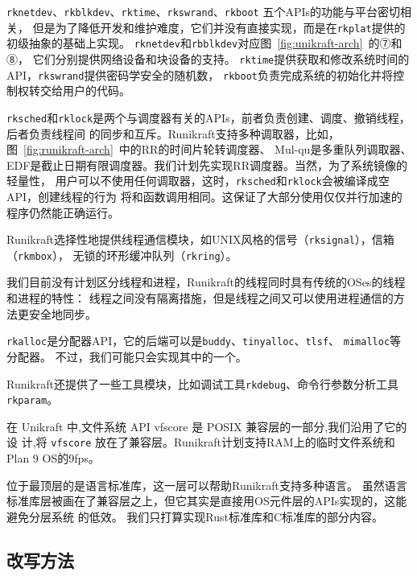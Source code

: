 \documentclass{../runikraft-report}
\begin{document}
\texttt{rknetdev}、\texttt{rkblkdev}、\texttt{rktime}、\texttt{rkswrand}、\texttt{rkboot}
五个APIs的功能与平台密切相关，
但是为了降低开发和维护难度，它们并没有直接实现，而是在\texttt{rkplat}提供的初级抽象的基础上实现。
\texttt{rknetdev}和\texttt{rbblkdev}对应图\ \ref{fig:unikraft-arch}\ 的⑦和⑧，
它们分别提供网络设备和块设备的支持。
\texttt{rktime}提供获取和修改系统时间的API，\texttt{rkswrand}提供密码学安全的随机数，
\texttt{rkboot}负责完成系统的初始化并将控制权转交给用户的代码。

\texttt{rksched}和\texttt{rklock}是两个与调度器有关的APIs，前者负责创建、调度、撤销线程，后者负责线程间
的同步和互斥。Runikraft支持多种调取器，比如，图\ \ref{fig:runikraft-arch}\ 中的RR的时间片轮转调度器、
Mul-qu是多重队列调取器、EDF是截止日期有限调度器。我们计划先实现RR调度器。当然，为了系统镜像的轻量性，
用户可以不使用任何调取器，这时，\texttt{rksched}和\texttt{rklock}会被编译成空API，创建线程的行为
将和函数调用相同。这保证了大部分使用仅仅并行加速的程序仍然能正确运行。

Runikraft选择性地提供线程通信模块，如UNIX风格的信号（\texttt{rksignal}），信箱（\texttt{rkmbox}），
无锁的环形缓冲队列（\texttt{rkring}）。

我们目前没有计划区分线程和进程，Runikraft的线程同时具有传统的OSes的线程和进程的特性：
线程之间没有隔离措施，但是线程之间又可以使用进程通信的方法更安全地同步。

\texttt{rkalloc}是分配器API，它的后端可以是\texttt{buddy}、\texttt{tinyalloc}、\texttt{tlsf}、
\texttt{mimalloc}等分配器。
不过，我们可能只会实现其中的一个。

Runikraft还提供了一些工具模块，比如调试工具\texttt{rkdebug}、命令行参数分析工具\texttt{rkparam}。

在 Unikraft 中,文件系统 API vfscore 是 POSIX 兼容层的一部分,我们沿用了它的设
计,将 \texttt{vfscore} 放在了兼容层。Runikraft计划支持RAM上的临时文件系统和Plan 9 OS的9fps。

位于最顶层的是语言标准库，这一层可以帮助Runikraft支持多种语言。
虽然语言标准库层被画在了兼容层之上，但它其实是直接用OS元件层的APIs实现的，这能避免分层系统
的低效。
我们只打算实现Rust标准库和C标准库的部分内容。

\subsection{改写方法}
\end{document}
